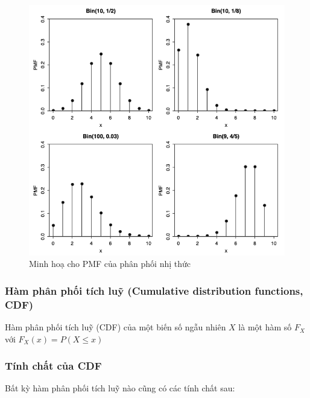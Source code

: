\documentclass[
]{book}
\begin{document}
\begin{figure}

{\centering \includegraphics[width=1\linewidth]{figures/Picture09} 

}

\caption{Minh hoạ cho PMF của phân phối nhị thức}\label{fig:unnamed-chunk-5}
\end{figure}

\hypertarget{huxe0m-phuxe2n-phux1ed1i-tuxedch-luux1ef9-cumulative-distribution-functions-cdf}{%
\subsubsection{Hàm phân phối tích luỹ (Cumulative distribution functions, CDF)}\label{huxe0m-phuxe2n-phux1ed1i-tuxedch-luux1ef9-cumulative-distribution-functions-cdf}}

Hàm phân phối tích luỹ (CDF) của một biến số ngẫu nhiên \(X\) là một hàm số \(F_X\) với \(F_X(x) = P(X \leq x)\)

\hypertarget{tuxednh-chux1ea5t-cux1ee7a-cdf}{%
\subsubsection{Tính chất của CDF}\label{tuxednh-chux1ea5t-cux1ee7a-cdf}}

Bất kỳ hàm phân phối tích luỹ nào cũng có các tính chất sau:
\end{document}
